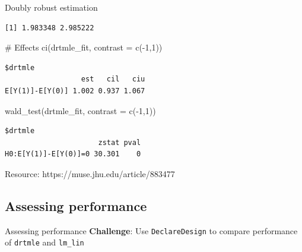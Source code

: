 \documentclass[
  11pt,
  ignorenonframetext,
]{beamer}
\newenvironment{Shaded}{\begin{snugshade}}{\end{snugshade}}
\newcommand{\AttributeTok}[1]{\textcolor[rgb]{0.40,0.45,0.13}{#1}}
\newcommand{\CommentTok}[1]{\textcolor[rgb]{0.37,0.37,0.37}{#1}}
\newcommand{\DecValTok}[1]{\textcolor[rgb]{0.68,0.00,0.00}{#1}}
\newcommand{\FunctionTok}[1]{\textcolor[rgb]{0.28,0.35,0.67}{#1}}
\newcommand{\NormalTok}[1]{\textcolor[rgb]{0.00,0.23,0.31}{#1}}
\newcommand{\SpecialCharTok}[1]{\textcolor[rgb]{0.37,0.37,0.37}{#1}}
\begin{document}
\begin{frame}[fragile]{Doubly robust estimation}
\protect\hypertarget{doubly-robust-estimation-5}{}
\begin{Shaded}
\end{Shaded}

\begin{verbatim}
[1] 1.983348 2.985222
\end{verbatim}

\begin{Shaded}
\begin{Highlighting}[]
\CommentTok{\# Effects}
\FunctionTok{ci}\NormalTok{(drtmle\_fit, }\AttributeTok{contrast =} \FunctionTok{c}\NormalTok{(}\SpecialCharTok{{-}}\DecValTok{1}\NormalTok{,}\DecValTok{1}\NormalTok{))}
\end{Highlighting}
\end{Shaded}

\begin{verbatim}
$drtmle
                  est   cil   ciu
E[Y(1)]-E[Y(0)] 1.002 0.937 1.067
\end{verbatim}

\begin{Shaded}
\begin{Highlighting}[]
\FunctionTok{wald\_test}\NormalTok{(drtmle\_fit, }\AttributeTok{contrast =} \FunctionTok{c}\NormalTok{(}\SpecialCharTok{{-}}\DecValTok{1}\NormalTok{,}\DecValTok{1}\NormalTok{))}
\end{Highlighting}
\end{Shaded}

\begin{verbatim}
$drtmle
                      zstat pval
H0:E[Y(1)]-E[Y(0)]=0 30.301    0
\end{verbatim}

Resource: https://muse.jhu.edu/article/883477
\end{frame}

\hypertarget{assessing-performance}{%
\subsection{Assessing performance}\label{assessing-performance}}

\begin{frame}[fragile]{Assessing performance}
\textbf{Challenge}: Use \texttt{DeclareDesign} to compare performance of
\texttt{drtmle} and \texttt{lm\_lin}
\end{frame}
\end{document}
